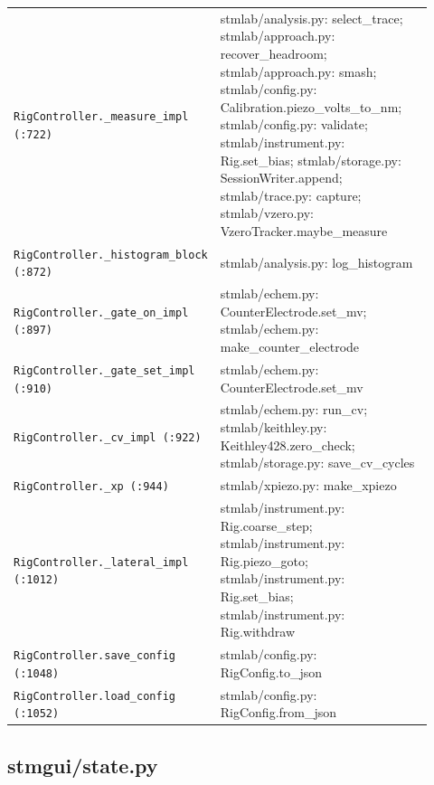\begin{longtable}{@{}>{\raggedright\arraybackslash}p{0.280\linewidth}>{\raggedright\arraybackslash}p{0.640\linewidth}@{}}
\texttt{Rig\discretionary{}{}{}Controller.\discretionary{}{}{}\_\discretionary{}{}{}measure\_\discretionary{}{}{}impl (:722)} & stmlab/analysis.py: select\_trace; stmlab/approach.py: recover\_headroom; stmlab/approach.py: smash; stmlab/config.py: Calibration.piezo\_volts\_to\_nm; stmlab/config.py: validate; stmlab/instrument.py: Rig.set\_bias; stmlab/storage.py: SessionWriter.append; stmlab/trace.py: capture; stmlab/vzero.py: VzeroTracker.maybe\_measure \\
\texttt{Rig\discretionary{}{}{}Controller.\discretionary{}{}{}\_\discretionary{}{}{}histogram\_\discretionary{}{}{}block (:872)} & stmlab/analysis.py: log\_histogram \\
\texttt{Rig\discretionary{}{}{}Controller.\discretionary{}{}{}\_\discretionary{}{}{}gate\_\discretionary{}{}{}on\_\discretionary{}{}{}impl (:897)} & stmlab/echem.py: CounterElectrode.set\_mv; stmlab/echem.py: make\_counter\_electrode \\
\texttt{Rig\discretionary{}{}{}Controller.\discretionary{}{}{}\_\discretionary{}{}{}gate\_\discretionary{}{}{}set\_\discretionary{}{}{}impl (:910)} & stmlab/echem.py: CounterElectrode.set\_mv \\
\texttt{Rig\discretionary{}{}{}Controller.\discretionary{}{}{}\_\discretionary{}{}{}cv\_\discretionary{}{}{}impl (:922)} & stmlab/echem.py: run\_cv; stmlab/keithley.py: Keithley428.zero\_check; stmlab/storage.py: save\_cv\_cycles \\
\texttt{Rig\discretionary{}{}{}Controller.\discretionary{}{}{}\_\discretionary{}{}{}xp (:944)} & stmlab/xpiezo.py: make\_xpiezo \\
\texttt{Rig\discretionary{}{}{}Controller.\discretionary{}{}{}\_\discretionary{}{}{}lateral\_\discretionary{}{}{}impl (:1012)} & stmlab/instrument.py: Rig.coarse\_step; stmlab/instrument.py: Rig.piezo\_goto; stmlab/instrument.py: Rig.set\_bias; stmlab/instrument.py: Rig.withdraw \\
\texttt{Rig\discretionary{}{}{}Controller.\discretionary{}{}{}save\_\discretionary{}{}{}config (:1048)} & stmlab/config.py: RigConfig.to\_json \\
\texttt{Rig\discretionary{}{}{}Controller.\discretionary{}{}{}load\_\discretionary{}{}{}config (:1052)} & stmlab/config.py: RigConfig.from\_json \\
\bottomrule
\end{longtable}
\normalsize

\subsection{stmgui/state.py}

